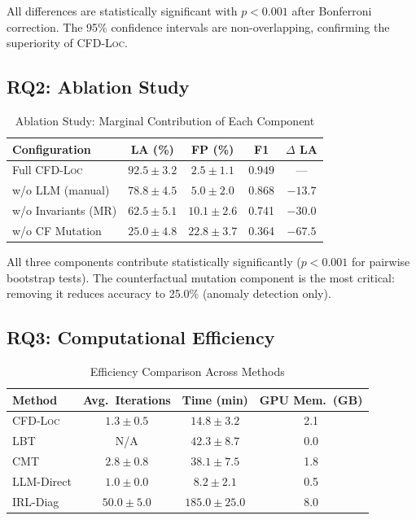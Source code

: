 \documentclass[journal]{IEEEtran}
\theoremstyle{plain}
\theoremstyle{definition}
\theoremstyle{remark}
\newcommand{\methodname}{\textsc{CFD-Loc}}
\begin{document}
\noindent All differences are statistically significant with $p < 0.001$ after Bonferroni correction. The 95\% confidence intervals are non-overlapping, confirming the superiority of \methodname.

\subsection{RQ2: Ablation Study}

\begin{table}[t]
\centering
\caption{Ablation Study: Marginal Contribution of Each Component}
\label{tab:ablation}
\small
\begin{tabular}{lcccc}
\toprule
\textbf{Configuration} & \textbf{LA (\%)} & \textbf{FP (\%)} & \textbf{F1} & $\Delta$ LA \\\midrule
Full \methodname & $\mathbf{92.5 \pm 3.2}$ & $\mathbf{2.5 \pm 1.1}$ & $\mathbf{0.949}$ & --- \\
w/o LLM (manual) & $78.8 \pm 4.5$ & $5.0 \pm 2.0$ & 0.868 & $-13.7$ \\
w/o Invariants (MR) & $62.5 \pm 5.1$ & $10.1 \pm 2.6$ & 0.741 & $-30.0$ \\
w/o CF Mutation & $25.0 \pm 4.8$ & $22.8 \pm 3.7$ & 0.364 & $-67.5$ \\
\bottomrule
\end{tabular}
\end{table}

\noindent All three components contribute statistically significantly ($p < 0.001$ for pairwise bootstrap tests). The counterfactual mutation component is the most critical: removing it reduces accuracy to 25.0\% (anomaly detection only).

\subsection{RQ3: Computational Efficiency}

\begin{table}[t]
\centering
\caption{Efficiency Comparison Across Methods}
\label{tab:efficiency}
\small
\begin{tabular}{lccc}
\toprule
\textbf{Method} & \textbf{Avg.\ Iterations} & \textbf{Time (min)} & \textbf{GPU Mem.\ (GB)} \\\midrule
\methodname & $1.3 \pm 0.5$ & $14.8 \pm 3.2$ & 2.1 \\
LBT & N/A & $42.3 \pm 8.7$ & 0.0 \\
CMT & $2.8 \pm 0.8$ & $38.1 \pm 7.5$ & 1.8 \\
LLM-Direct & $1.0 \pm 0.0$ & $8.2 \pm 2.1$ & 0.5 \\
IRL-Diag & $50.0 \pm 5.0$ & $185.0 \pm 25.0$ & 8.0 \\
\bottomrule
\end{tabular}
\end{table}
\end{document}
